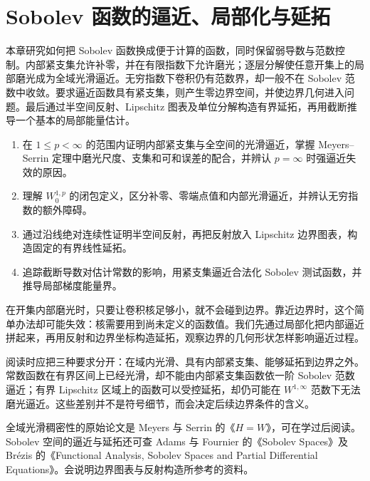 \chapter{Sobolev 函数的逼近、局部化与延拓}
\label{b1:ch:22}
\begin{chapterabstract}
本章研究如何把 Sobolev 函数换成便于计算的函数，同时保留弱导数与范数控制。内部紧支集允许补零，并在有限指数下允许磨光；逐层分解使任意开集上的局部磨光成为全域光滑逼近。无穷指数下卷积仍有范数界，却一般不在 Sobolev 范数中收敛。要求逼近函数具有紧支集，则产生零边界空间，并使边界几何进入问题。最后通过半空间反射、Lipschitz 图表及单位分解构造有界延拓，再用截断推导一个基本的局部能量估计。
\end{chapterabstract}

\begin{learninggoals}
\begin{enumerate}
\item\label{b1:goal:22-approximation}在 \(1\le p<\infty\) 的范围内证明内部紧支集与全空间的光滑逼近，掌握 Meyers--Serrin 定理中磨光尺度、支集和可和误差的配合，并辨认 \(p=\infty\) 时强逼近失效的原因。
\item\label{b1:goal:22-zero-boundary}理解 \(W_0^{1,p}\) 的闭包定义，区分补零、零端点值和内部光滑逼近，并辨认无穷指数的额外障碍。
\item\label{b1:goal:22-extension}通过沿线绝对连续性证明半空间反射，再把反射放入 Lipschitz 边界图表，构造固定的有界线性延拓。
\item\label{b1:goal:22-localization}追踪截断导数对估计常数的影响，用紧支集逼近合法化 Sobolev 测试函数，并推导局部梯度能量界。
\end{enumerate}
\end{learninggoals}

在开集内部磨光时，只要让卷积核足够小，就不会碰到边界。靠近边界时，这个简单办法却可能失效：核需要用到尚未定义的函数值。我们先通过局部化把内部逼近拼起来，再用反射和边界坐标构造延拓，观察边界的几何形状怎样影响逼近过程。

\ProseParagraphBreak

阅读时应把三种要求分开：在域内光滑、具有内部紧支集、能够延拓到边界之外。常数函数在有界区间上已经光滑，却不能由内部紧支集函数依一阶 Sobolev 范数逼近；有界 Lipschitz 区域上的函数可以受控延拓，却仍可能在 \(W^{1,\infty}\) 范数下无法磨光逼近。这些差别并不是符号细节，而会决定后续边界条件的含义。

\ProseParagraphBreak

全域光滑稠密性的原始论文是 Meyers 与 Serrin 的《\(H=W\)》\cite{MeyersSerrin1964HW}，可在学过后阅读。Sobolev 空间的逼近与延拓还可查 Adams 与 Fournier 的《Sobolev Spaces》\cite{Adams2003Sobolev}及 Brézis 的《Functional Analysis, Sobolev Spaces and Partial Differential Equations》\cite{Brezis2011Functional}。会说明边界图表与反射构造所参考的资料。

